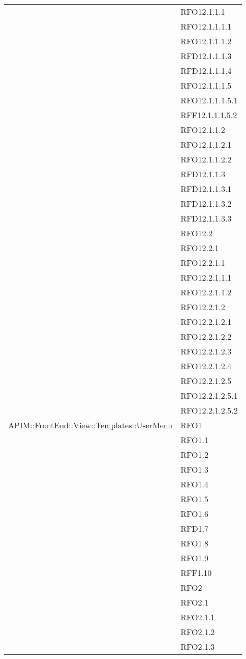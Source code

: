 \begin{longtable}{ p{12cm} | p{4cm} }
& RFO12.1.1.1 \\
& RFO12.1.1.1.1 \\
& RFO12.1.1.1.2 \\
& RFD12.1.1.1.3 \\
& RFD12.1.1.1.4 \\
& RFO12.1.1.1.5 \\
& RFO12.1.1.1.5.1 \\
& RFF12.1.1.1.5.2 \\
& RFO12.1.1.2 \\
& RFO12.1.1.2.1 \\
& RFO12.1.1.2.2 \\
& RFD12.1.1.3 \\
& RFD12.1.1.3.1 \\
& RFD12.1.1.3.2 \\
& RFD12.1.1.3.3 \\
& RFO12.2 \\
& RFO12.2.1 \\
& RFO12.2.1.1 \\
& RFO12.2.1.1.1 \\
& RFO12.2.1.1.2 \\
& RFO12.2.1.2 \\
& RFO12.2.1.2.1 \\
& RFO12.2.1.2.2 \\
& RFO12.2.1.2.3 \\
& RFO12.2.1.2.4 \\
& RFO12.2.1.2.5 \\
& RFO12.2.1.2.5.1 \\
& RFO12.2.1.2.5.2 \\
		    \hline	    
		    APIM::FrontEnd::View::Templates::UserMenu
		    & RFO1 \\
		    & RFO1.1 \\
		    & RFO1.2 \\
		    & RFO1.3 \\
		    & RFO1.4 \\
		    & RFO1.5 \\
		    & RFO1.6 \\
		    & RFD1.7 \\
		    & RFO1.8 \\
		    & RFO1.9 \\
		    & RFF1.10 \\
		    & RFO2 \\
		    & RFO2.1 \\
		    & RFO2.1.1 \\
		    & RFO2.1.2 \\
		    & RFO2.1.3 \\

\end{longtable}
